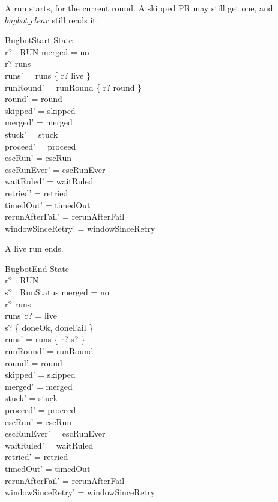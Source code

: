 \documentclass{article}
\begin{document}
A run starts, for the current round. A skipped PR may still get one, and
$bugbot\_clear$ still reads it.

\begin{schema}{BugbotStart}
  \Delta State \\
  r? : RUN
\where
  merged = no \\
  r? \notin \dom runs \\
  runs' = runs \cup \{ r? \mapsto live \} \\
  runRound' = runRound \cup \{ r? \mapsto round \} \\
  round' = round \\
  skipped' = skipped \\
  merged' = merged \\
  stuck' = stuck \\
  proceed' = proceed \\
  escRun' = escRun \\
  escRunEver' = escRunEver \\
  waitRuled' = waitRuled \\
  retried' = retried \\
  timedOut' = timedOut \\
  rerunAfterFail' = rerunAfterFail \\
  windowSinceRetry' = windowSinceRetry
\end{schema}

A live run ends.

\begin{schema}{BugbotEnd}
  \Delta State \\
  r? : RUN \\
  s? : RunStatus
\where
  merged = no \\
  r? \in \dom runs \\
  runs~r? = live \\
  s? \in \{ doneOk, doneFail \} \\
  runs' = runs \oplus \{ r? \mapsto s? \} \\
  runRound' = runRound \\
  round' = round \\
  skipped' = skipped \\
  merged' = merged \\
  stuck' = stuck \\
  proceed' = proceed \\
  escRun' = escRun \\
  escRunEver' = escRunEver \\
  waitRuled' = waitRuled \\
  retried' = retried \\
  timedOut' = timedOut \\
  rerunAfterFail' = rerunAfterFail \\
  windowSinceRetry' = windowSinceRetry
\end{schema}
\end{document}
